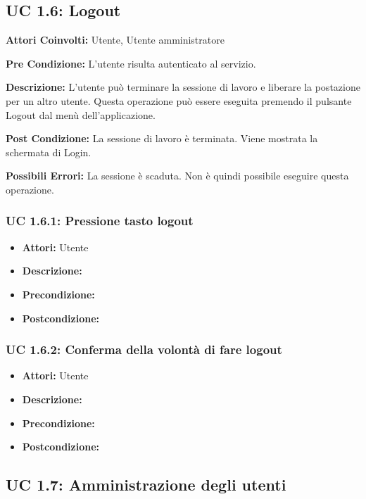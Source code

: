 \subsection{UC 1.6: Logout}

\textbf{Attori Coinvolti:}
Utente, Utente amministratore

\textbf{Pre Condizione:}
L'utente risulta autenticato al servizio.

\textbf{Descrizione:}
L'utente può terminare la sessione di lavoro e liberare la postazione per un altro utente.
Questa operazione può essere eseguita premendo il pulsante Logout dal menù dell'applicazione.

\textbf{Post Condizione:}
La sessione di lavoro è terminata. Viene mostrata la schermata di Login.

\textbf{Possibili Errori:}
La sessione è scaduta. Non è quindi possibile eseguire questa operazione.

\subsubsection{UC 1.6.1: Pressione tasto logout}

\begin{itemize}
\item \textbf{Attori:} Utente
\item \textbf{Descrizione:} 
\item \textbf{Precondizione:} 
\item \textbf{Postcondizione:} 
\end{itemize}

\subsubsection{UC 1.6.2: Conferma della volontà di fare logout}

\begin{itemize}
\item \textbf{Attori:} Utente
\item \textbf{Descrizione:} 
\item \textbf{Precondizione:} 
\item \textbf{Postcondizione:} 
\end{itemize}



\subsection{UC 1.7: Amministrazione degli utenti}


